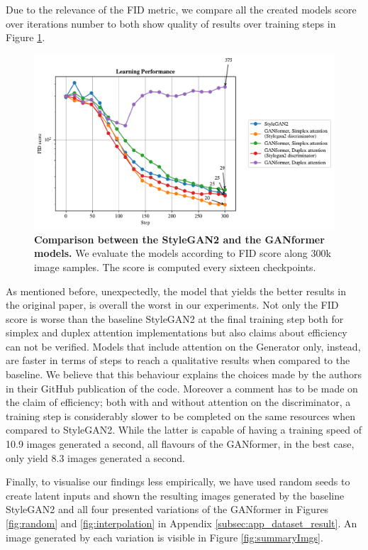 \documentclass{article}
\begin{document}
	Due to the relevance of the FID metric, we compare all the created models score over iterations 
	number to both show quality of results over training steps in Figure \ref{fig:performance}.
	\begin{figure}[htpb]				
		\centering
		\raggedleft
		\includegraphics[width=.83\linewidth]{FIDscore.pdf}
		\caption{\textbf{Comparison between the StyleGAN2 and the GANformer models.} We evaluate 
			the models according to FID score along 300k image samples. The score is computed every 
			sixteen checkpoints.}
		\label{fig:performance}
	\end{figure}
	
	As mentioned before, unexpectedly, the model that yields the better results in the original paper, is 
	overall the worst in our experiments.
	Not only the FID score is worse than the baseline StyleGAN2 at the final training step both for 
	simplex and duplex attention implementations but also claims about efficiency can not be verified.
	Models that include attention on the Generator only, instead, are faster in terms of steps to reach a 
	qualitative results when compared to the baseline.
	We believe that this behaviour explains the choices made by the authors in their GitHub publication 
	of the code.
	Moreover a comment has to be made on the claim of efficiency; both with and without attention on 
	the discriminator, a training step is considerably slower to be completed on the same resources 
	when compared to StyleGAN2.
	While the latter is capable of having a training speed of 10.9 images generated a second, all flavours 
	of the GANformer, in the best case, only yield 8.3 images generated a second.
	
	Finally, to visualise our findings less empirically, we have used random 
	seeds to create latent inputs and shown the resulting images generated by the baseline 
	StyleGAN2 and all four presented variations of the GANformer in Figures \ref{fig:random} and 
	\ref{fig:interpolation} in Appendix \ref{subsec:app_dataset_result}.
	An image generated by each variation is visible in Figure \ref{fig:summaryImgs}.
	
\end{document}
